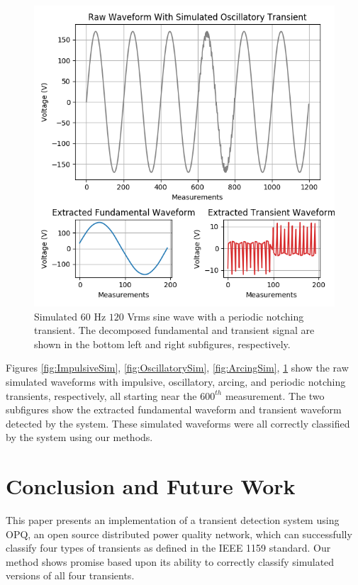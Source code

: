\documentclass[10pt, conference, compsocconf]{IEEEtran}
\begin{document}
\begin{figure}[htbp]
\centering%
\includegraphics[scale=0.35]{./figures/notching_sim.png}
\caption{Simulated $60$ Hz $120$ Vrms sine wave with a periodic notching transient. The decomposed fundamental and transient signal are shown in the bottom left and right subfigures, respectively.}\label{fig:NotchingSim}
\end{figure}

Figures \ref{fig:ImpulsiveSim}, \ref{fig:OscillatorySim}, \ref{fig:ArcingSim}, \ref{fig:NotchingSim} show the raw simulated waveforms with impulsive, oscillatory, arcing, and periodic notching transients, respectively, all starting near the $600^{th}$ measurement. The two subfigures show the extracted fundamental waveform and transient waveform detected by the system. These simulated waveforms were all correctly classified by the system using our methods. 

\section{Conclusion and Future Work}
\label{sec:Conlcusion}

This paper presents an implementation of a transient detection system using OPQ, an open source distributed power quality network, which can successfully classify four types of transients as defined in the IEEE 1159 standard. Our method shows promise based upon its ability to correctly classify simulated versions of all four transients.
\end{document}
